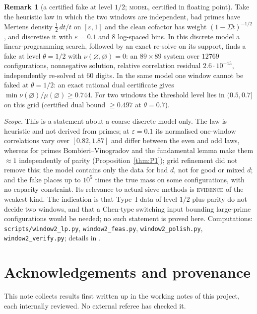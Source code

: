 \documentclass[11pt,reqno]{amsart}
\theoremstyle{definition}
\newtheorem{remark}[theorem]{Remark}
\newcommand{\status}[1]{\textup{\textsc{#1}}}
\begin{document}
\begin{remark}[a certified fake at level $1/2$; \status{model}, certified in floating point]\label{rem:LPmodel}
Take the heuristic law in which the two windows are independent, bad
primes have Mertens density $\frac12\,dt/t$ on $[\varepsilon,1]$ and the
clean cofactor has weight $(1-\Sigma t)^{-1/2}$, and discretise it with
$\varepsilon=0.1$ and $8$ log-spaced bins.  In this discrete model a
linear-programming search, followed by an exact re-solve on its support,
finds a fake at level $\theta=1/2$ with $\nu(\varnothing,\varnothing)=0$: an
$89\times89$ system over $12769$ configurations, nonnegative solution,
relative correlation residual $2.6\cdot10^{-15}$, independently re-solved at
$60$ digits.  In the same model one window cannot be faked at $\theta=1/2$:
an exact rational dual certificate gives
$\min\nu(\varnothing)/\mu(\varnothing)\ge0.744$.  For two windows the
threshold level lies in $(0.5,0.7]$ on this grid (certified dual bound
$\ge0.497$ at $\theta=0.7$).

\emph{Scope.}  This is a statement about a coarse discrete model only.
The law is heuristic and not derived from primes; at $\varepsilon=0.1$ its
normalised one-window correlations vary over $[0.82,1.87]$ and differ
between the even and odd laws, whereas for primes Bombieri--Vinogradov
and the fundamental lemma make them $\approx1$ independently of parity
(Proposition~\ref{thm:P1}); grid refinement did not remove this; the model
contains only the data for bad $d$, not for good or mixed $d$; and the fake
places up to $10^5$ times the true mass on some configurations, with no
capacity constraint.  Its relevance to actual sieve methods is
\status{evidence} of the weakest kind.  The indication is that Type~I data
of level $1/2$ plus parity do not decide two windows, and that a
Chen-type switching input bounding large-prime configurations would be
needed; no such statement is proved here.  Computations:
\texttt{scripts/window2\_lp.py}, \texttt{window2\_feas.py},
\texttt{window2\_polish.py}, \texttt{window2\_verify.py}; details in
\cite[\S3]{PW2}.
\end{remark}

\section*{Acknowledgements and provenance}
This note collects results first written up in the working notes
\cite{PS,PW,PX,PW2} of this project, each internally reviewed.  No
external referee has checked it.
\end{document}
